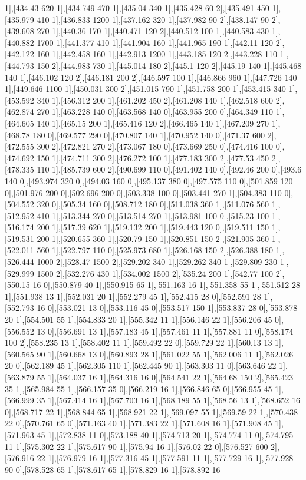 {1],[434.43 620 1],[434.749 470 1],[435.04 340 1],[435.428 60 2],[435.491 450 1],[435.979 410 1],[436.833 1200 1],[437.162 320 1],[437.982 90 2],[438.147 90 2],[439.608 270 1],[440.36 170 1],[440.471 120 2],[440.512 100 1],[440.583 430 1],[440.882 1700 1],[441.377 410 1],[441.904 160 1],[441.965 190 1],[442.11 120 2],[442.122 160 1],[442.458 160 1],[442.913 1200 1],[443.185 120 2],[443.228 110 1],[444.793 150 2],[444.983 730 1],[445.014 180 2],[445.1 120 2],[445.19 140 1],[445.468 140 1],[446.102 120 2],[446.181 200 2],[446.597 100 1],[446.866 960 1],[447.726 140 1],[449.646 1100 1],[450.031 300 2],[451.015 790 1],[451.758 200 1],[453.415 340 1],[453.592 340 1],[456.312 200 1],[461.202 450 2],[461.208 140 1],[462.518 600 2],[462.874 270 1],[463.228 140 0],[463.568 140 0],[463.955 200 0],[464.349 110 1],[464.605 140 1],[465.15 200 1],[465.416 120 2],[466.465 140 1],[467.209 270 1],[468.78 180 0],[469.577 290 0],[470.807 140 1],[470.952 140 0],[471.37 600 2],[472.555 300 2],[472.821 270 2],[473.067 180 0],[473.669 250 0],[474.416 100 0],[474.692 150 1],[474.711 300 2],[476.272 100 1],[477.183 300 2],[477.53 450 2],[478.335 110 1],[485.739 600 2],[490.699 110 0],[491.402 140 0],[492.46 200 0],[493.6 140 0],[493.974 320 0],[494.03 160 0],[495.137 380 0],[497.575 110 0],[501.859 120 0],[501.976 200 0],[502.696 200 0],[503.338 100 0],[503.441 270 1],[504.383 110 0],[504.552 320 0],[505.34 160 0],[508.712 180 0],[511.038 360 1],[511.076 560 1],[512.952 410 1],[513.344 270 0],[513.514 270 1],[513.981 100 0],[515.23 100 1],[516.174 200 1],[517.39 620 1],[519.132 200 1],[519.443 120 0],[519.511 150 1],[519.531 200 1],[520.655 360 1],[520.79 150 1],[520.851 150 2],[521.905 360 1],[522.011 560 1],[522.797 110 0],[525.973 680 1],[526.168 150 2],[526.388 180 1],[526.444 1000 2],[528.47 1500 2],[529.202 340 1],[529.262 340 1],[529.809 230 1],[529.999 1500 2],[532.276 430 1],[534.002 1500 2],[535.24 200 1],[542.77 100 2],[550.15 16 0],[550.879 40 1],[550.915 65 1],[551.163 16 1],[551.358 55 1],[551.512 28 1],[551.938 13 1],[552.031 20 1],[552.279 45 1],[552.415 28 0],[552.591 28 1],[552.793 16 0],[553.021 13 0],[553.116 45 0],[553.517 150 1],[553.837 28 0],[553.878 20 1],[554.501 55 1],[554.833 20 1],[555.342 11 1],[556.146 22 1],[556.206 45 0],[556.552 13 0],[556.691 13 1],[557.183 45 1],[557.461 11 1],[557.881 11 0],[558.174 100 2],[558.235 13 1],[558.402 11 1],[559.492 22 0],[559.729 22 1],[560.13 13 1],[560.565 90 1],[560.668 13 0],[560.893 28 1],[561.022 55 1],[562.006 11 1],[562.026 20 0],[562.189 45 1],[562.305 110 1],[562.445 90 1],[563.303 11 0],[563.646 22 1],[563.879 55 1],[564.037 16 1],[564.316 16 0],[564.541 22 1],[564.68 150 2],[565.423 35 1],[565.984 55 1],[566.157 35 0],[566.219 16 1],[566.846 65 0],[566.955 45 1],[566.999 35 1],[567.414 16 1],[567.703 16 1],[568.189 55 1],[568.56 13 1],[568.652 16 0],[568.717 22 1],[568.844 65 1],[568.921 22 1],[569.097 55 1],[569.59 22 1],[570.438 22 0],[570.761 65 0],[571.163 40 1],[571.383 22 1],[571.608 16 1],[571.908 45 1],[571.963 45 1],[572.838 11 0],[573.188 40 1],[574.713 20 1],[574.774 11 0],[574.795 11 1],[575.302 22 1],[575.617 90 1],[575.94 16 1],[576.02 22 0],[576.527 600 2],[576.916 22 1],[576.979 16 1],[577.316 45 1],[577.591 11 1],[577.729 16 1],[577.928 90 0],[578.528 65 1],[578.617 65 1],[578.829 16 1],[578.892 16 }
